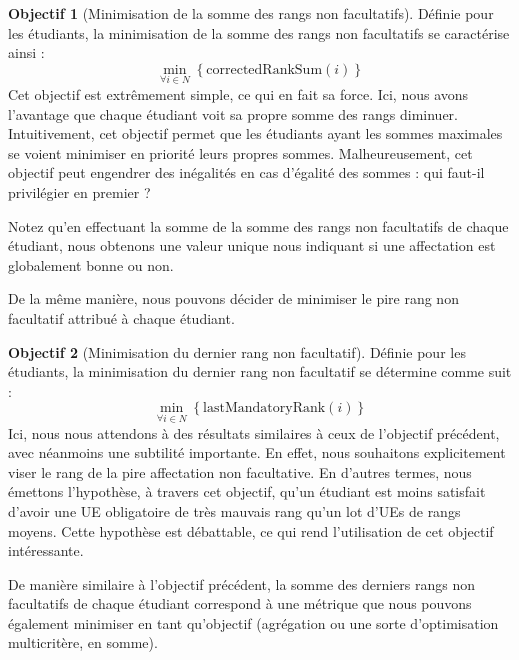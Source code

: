 \documentclass{rapport}
\theoremstyle{definition}
\theoremstyle{remark}
\theoremstyle{plain}
\theoremstyle{definition}
\theoremstyle{definition}
\newtheorem*{goal}{Objectif}
\theoremstyle{remark}
\theoremstyle{definition}
\begin{document}
\begin{goal}[Minimisation de la somme des rangs non facultatifs]
    Définie pour les étudiants, la minimisation de la somme des rangs non facultatifs se caractérise ainsi :
    $$
        \min_{\forall i\in N}\left\{\text{correctedRankSum}(i)\right\}
    $$
    Cet objectif est extrêmement simple, ce qui en fait sa force. Ici, nous avons l'avantage que chaque étudiant voit sa propre somme des rangs diminuer.
    Intuitivement, cet objectif permet que les étudiants ayant les sommes maximales se voient minimiser en priorité leurs propres sommes.
    Malheureusement, cet objectif peut engendrer des inégalités en cas d'égalité des sommes : qui faut-il privilégier en premier ?

    Notez qu'en effectuant la somme de la somme des rangs non facultatifs de chaque étudiant, nous obtenons une valeur unique nous indiquant si une affectation est globalement bonne ou non.
\end{goal}

De la même manière, nous pouvons décider de minimiser le pire rang non facultatif attribué à chaque étudiant.
\begin{goal}[Minimisation du dernier rang non facultatif]
    Définie pour les étudiants, la minimisation du dernier rang non facultatif se détermine comme suit :
    $$
        \min_{\forall i\in N}\left\{\text{lastMandatoryRank}(i)\right\}
    $$
    Ici, nous nous attendons à des résultats similaires à ceux de l'objectif précédent, avec néanmoins une subtilité importante.
    En effet, nous souhaitons explicitement viser le rang de la pire affectation non facultative.
    En d'autres termes, nous émettons l'hypothèse, à travers cet objectif, qu'un étudiant est moins satisfait d'avoir une UE obligatoire de très mauvais rang qu'un lot d'UEs de rangs moyens.
    Cette hypothèse est débattable, ce qui rend l'utilisation de cet objectif intéressante.

    De manière similaire à l'objectif précédent, la somme des derniers rangs non facultatifs de chaque étudiant correspond à une métrique que nous pouvons également minimiser en tant qu'objectif (agrégation ou une sorte d'optimisation multicritère, en somme).
\end{goal}
\end{document}
